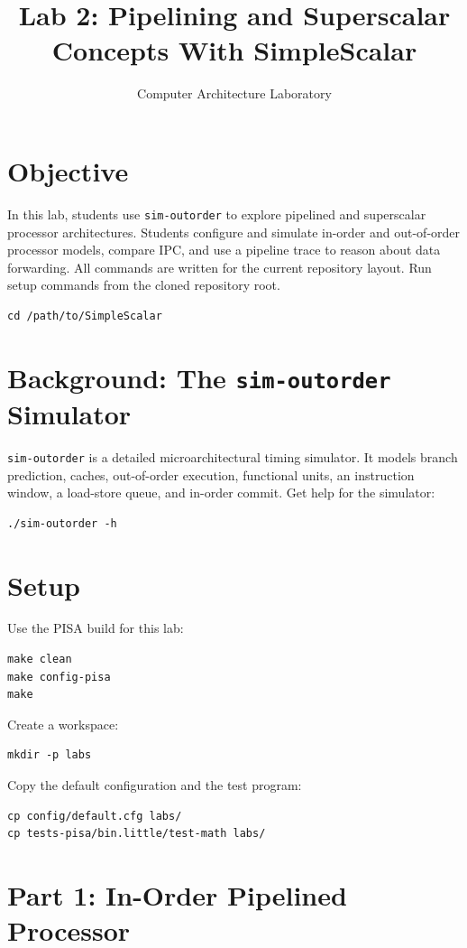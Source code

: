 \documentclass[11pt]{article}
\title{Lab 2: Pipelining and Superscalar Concepts With SimpleScalar}
\author{Computer Architecture Laboratory}
\date{}
\begin{document}
\maketitle
\section{Objective}
In this lab, students use \texttt{sim-outorder} to explore pipelined and superscalar processor architectures. Students configure and simulate in-order and out-of-order processor models, compare IPC, and use a pipeline trace to reason about data forwarding.
All commands are written for the current repository layout. Run setup commands from the cloned repository root.
\begin{lstlisting}
cd /path/to/SimpleScalar
\end{lstlisting}
\section{Background: The \texttt{sim-outorder} Simulator}
\texttt{sim-outorder} is a detailed microarchitectural timing simulator. It models branch prediction, caches, out-of-order execution, functional units, an instruction window, a load-store queue, and in-order commit.
Get help for the simulator:
\begin{lstlisting}
./sim-outorder -h
\end{lstlisting}
\section{Setup}
Use the PISA build for this lab:
\begin{lstlisting}
make clean
make config-pisa
make
\end{lstlisting}
Create a workspace:
\begin{lstlisting}
mkdir -p labs
\end{lstlisting}
Copy the default configuration and the test program:
\begin{lstlisting}
cp config/default.cfg labs/
cp tests-pisa/bin.little/test-math labs/
\end{lstlisting}
\section{Part 1: In-Order Pipelined Processor}
\end{document}

